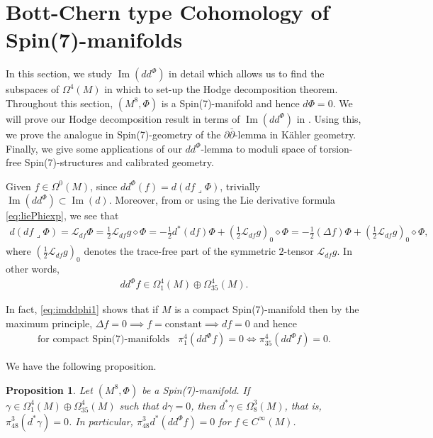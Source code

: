 \documentclass[10pt,a4paper,reqno]{article}
\newtheorem{proposition}[theorem]{Proposition}
\theoremstyle{definition}
\numberwithin{equation}{section}
\def\pt{\partial}
\def\ddphi{dd^{\Phi}}
\def\cL{\mathcal{L}}
\DeclareMathOperator{\Ima}{Im}
\begin{document}
\section{Bott-Chern type Cohomology of Spin(7)-manifolds}\label{sec:cohomology}

In this section, we study $\Ima(\ddphi)$ in detail which  allows us to find the subspaces of $\Omega^4(M)$ in which to set-up the Hodge decomposition theorem. Throughout this section, $(M^8, \Phi)$ is a Spin(7)-manifold and hence $d\Phi=0$. We will prove our Hodge decomposition result in terms of $\Ima(\ddphi)$ in . Using this, we prove the analogue in Spin(7)-geometry of the $\pt\bar{\pt}$-lemma in K\"ahler geometry. Finally, we give some applications of our $\ddphi$-lemma to moduli space of torsion-free Spin(7)-structures and calibrated geometry.  

\medskip

Given $f\in \Omega^0(M)$, since $\ddphi(f) = d(df\lrcorner \Phi)$, trivially $\Ima(\ddphi)\subset \Ima(d)$. Moreover, from  or using the Lie derivative formula \cref{eq:liePhiexp}, we see that
\begin{align}\label{eq:imddphi1}
d(df\lrcorner \Phi) = \cL_{df}\Phi = \frac 12 \cL_{df}g \diamond \Phi= -\frac 12 d^*(df)\Phi + \left(\frac 12 \cL_{df}g \right)_{0}\diamond \Phi = -\frac 12 (\Delta f)\Phi + \left(\frac 12 \cL_{df}g \right)_{0}\diamond \Phi,
\end{align}
where $\left(\frac 12 \cL_{df}g \right)_{0}$ denotes the trace-free part of the symmetric $2$-tensor $\cL_{df}g$. In other words,
\begin{align}
\ddphi f\in \Omega^4_1(M)\oplus \Omega^4_{35}(M). \label{eq:imddphi2}
\end{align}

In fact, \cref{eq:imddphi1} shows that if $M$ is a compact Spin(7)-manifold then by the maximum principle, $\Delta f=0 \implies f=\text{constant} \implies df=0$ and hence
\begin{align}
\text{for\ compact\ Spin(7)-manifolds}\ \ \ \ \pi^4_1(\ddphi f) =0 \iff \pi^4_{35}(\ddphi f)=0. 
\end{align}

We have the following proposition.

\begin{proposition}\label{prop:pi348d*zero}
Let $(M^8, \Phi)$ be a Spin(7)-manifold. If $\gamma\in \Omega^4_1(M)\oplus \Omega^4_{35}(M)$ such that $d\gamma=0$, then $d^*\gamma \in \Omega^3_8(M)$, that is, $\pi^3_{48}(d^*\gamma)=0$. In particular, $\pi^3_{48}d^*(\ddphi f)=0$ for $f\in C^{\infty}(M)$.
\end{proposition}
\end{document}
